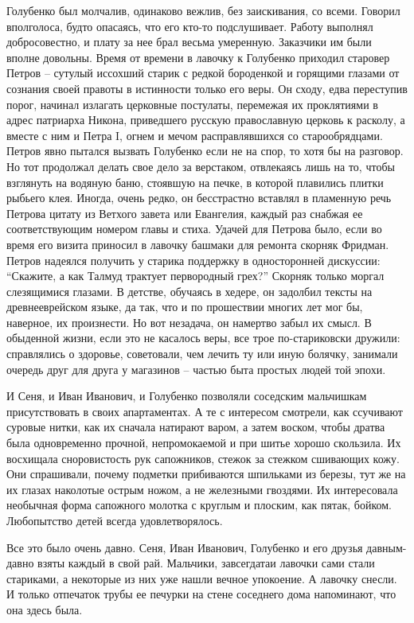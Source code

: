 Голубенко был молчалив, одинаково вежлив, без заискивания, со всеми. Говорил
вполголоса, будто опасаясь, что его кто-то подслушивает. Работу выполнял
добросовестно, и плату за нее брал весьма умеренную. Заказчики им были вполне
довольны. Время от времени в лавочку к Голубенко приходил старовер Петров –
сутулый иссохший старик с редкой бороденкой и горящими глазами от сознания
своей правоты в истинности только его веры. Он сходу, едва переступив порог,
начинал излагать церковные постулаты, перемежая их проклятиями в адрес
патриарха Никона, приведшего русскую православную церковь к расколу, а вместе с
ним и Петра I, огнем и мечом расправлявшихся со старообрядцами. Петров явно
пытался вызвать Голубенко если не на спор, то хотя бы на разговор. Но тот
продолжал делать свое дело за верстаком, отвлекаясь лишь на то, чтобы взглянуть
на водяную баню, стоявшую на печке, в которой плавились плитки рыбьего клея.
Иногда, очень редко, он бесстрастно вставлял в пламенную речь Петрова цитату из
Ветхого завета или Евангелия, каждый раз снабжая ее соответствующим номером
главы и стиха. Удачей для Петрова было, если во время его визита приносил в
лавочку башмаки для ремонта скорняк Фридман. Петров надеялся получить у старика
поддержку в односторонней дискуссии: \enquote{Скажите, а как Талмуд трактует
первородный грех?} Скорняк только моргал слезящимися глазами. В детстве,
обучаясь в хедере, он задолбил тексты на древнееврейском языке, да так, что и
по прошествии многих лет мог бы, наверное, их произнести. Но вот незадача, он
намертво забыл их смысл. В обыденной жизни, если это не касалось веры, все трое
по-стариковски дружили: справлялись о здоровье, советовали, чем лечить ту или
иную болячку, занимали очередь друг для друга у магазинов – частью быта простых
людей той эпохи.

И Сеня, и Иван Иванович, и Голубенко позволяли соседским мальчишкам
присутствовать в своих апартаментах. А те с интересом смотрели, как ссучивают
суровые нитки, как их сначала натирают варом, а затем воском, чтобы дратва была
одновременно прочной, непромокаемой и при шитье хорошо скользила. Их восхищала
сноровистость рук сапожников, стежок за стежком сшивающих кожу. Они спрашивали,
почему подметки прибиваются шпильками из березы, тут же на их глазах наколотые
острым ножом, а не железными гвоздями. Их интересовала необычная форма
сапожного молотка с круглым и плоским, как пятак, бойком. Любопытство детей
всегда удовлетворялось.

Все это было очень давно. Сеня, Иван Иванович, Голубенко и его друзья
давным-давно взяты каждый в свой рай. Мальчики, завсегдатаи лавочки сами стали
стариками, а некоторые из них уже нашли вечное упокоение. А лавочку снесли. И
только отпечаток трубы ее печурки на стене соседнего дома напоминают, что она
здесь была.
